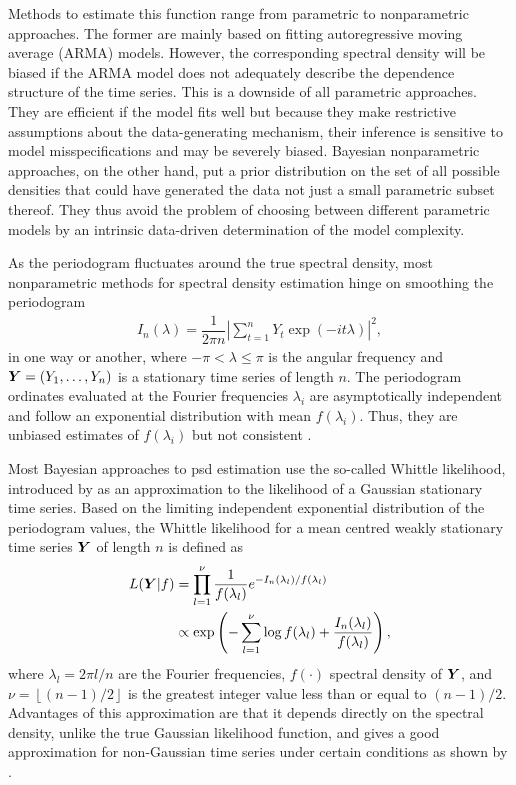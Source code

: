 \documentclass[twocolumn,final]{svjour3}
\newcommand{\bm}[1]{\mbox{\boldmath $#1$}}
\begin{document}
Methods to estimate this function range from parametric to nonparametric approaches.  The former are mainly based on fitting  autoregressive moving average (ARMA) models. However, the corresponding spectral density will be biased if the ARMA model does not adequately describe the dependence structure of the time series. This is a downside of all parametric approaches.
They are efficient if the model fits well but because they make restrictive assumptions about the data-generating mechanism, their inference is sensitive to model misspecifications and may  be severely biased. 
Bayesian nonparametric approaches, on the other hand, put a prior distribution on the set of all possible densities that could have generated the data not just a small parametric subset thereof. They thus avoid the problem of choosing between different parametric models  by an intrinsic data-driven determination of the model complexity.

As the periodogram fluctuates around the true spectral density, most  nonparametric methods for spectral density estimation hinge on  smoothing the periodogram
\begin{align*}
I_n(\lambda) = \dfrac{1}{2 \pi n} \left| \sum_{t=1}^{n} Y_t \exp \left( -i t \lambda\right)\right|^2,
\end{align*}
in one way or another, where $-\pi < \lambda \leq \pi$ is the angular frequency and $\bm{Y}=(Y_1,\ldots,Y_n)$ is a stationary time series of length $n$. The periodogram ordinates evaluated at the Fourier frequencies $\lambda_i$  are asymptotically independent and follow an exponential distribution with mean $f(\lambda_i)$.  Thus, they are unbiased estimates of $f(\lambda_i)$  but not consistent \citep{Brockwell:1986}.


Most Bayesian approaches to psd estimation use the so-called Whittle likelihood, introduced by \cite{Whittle:1957} as an approximation to the likelihood of a Gaussian stationary time series.  Based on the  limiting independent exponential distribution of the periodogram values, the Whittle likelihood for a mean centred weakly stationary time series $\bm{Y}$ of length $n$ is defined as
\begin{align}
L(\bm{Y} | f) &= \prod_{l=1}^{\nu}\dfrac{1}{f(\lambda_{l})} e^{-I_n(\lambda_l)/f(\lambda_l)}  \nonumber \\
&\propto \exp \left( - \sum_{l=1}^{\nu} \log f(\lambda_l) + \dfrac{I_{n}(\lambda_l)}{f(\lambda_l)} \right),\label{eq:whittle_like}
\end{align}
where $\lambda_l = 2\pi l / n$ are the Fourier frequencies, $f(\cdot)$ spectral density of $\bm{Y}$, and $\nu = \left\lfloor (n-1)/2 \right\rfloor$ is the greatest integer value less than or equal to $(n-1)/2$. Advantages of this approximation are that it depends directly on the spectral density, unlike the true Gaussian likelihood function, and gives a good approximation for non-Gaussian time series under certain conditions as shown by \cite{ShaoXiaofeng2007ASTf}.
\end{document}
